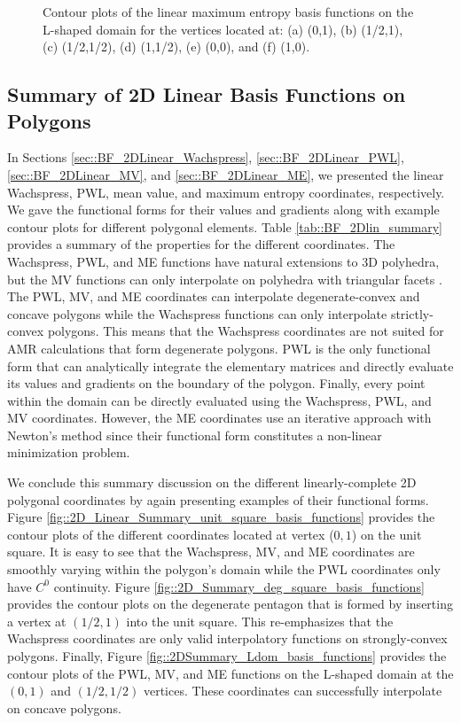 \begin{figure}
\begin{subfigure}[b]{0.39\textwidth}
		\caption{}
	\end{subfigure}
\caption{Contour plots of the linear maximum entropy basis functions on the L-shaped domain for the vertices located at: (a) (0,1), (b) (1/2,1), (c) (1/2,1/2), (d) (1,1/2), (e) (0,0), and (f) (1,0).}
\label{fig::2D_MAXENT1_Ldom_basis_functions}
\end{figure}

\subsection{Summary of 2D Linear Basis Functions on Polygons}
\label{sec::BF_2DLinear_Summary}

In Sections \ref{sec::BF_2DLinear_Wachspress}, \ref{sec::BF_2DLinear_PWL}, \ref{sec::BF_2DLinear_MV}, and \ref{sec::BF_2DLinear_ME}, we presented the linear Wachspress, PWL, mean value, and maximum entropy coordinates, respectively. We gave the functional forms for their values and gradients along with example contour plots for different polygonal elements. Table \ref{tab::BF_2Dlin_summary} provides a summary of the properties for the different coordinates. The Wachspress, PWL, and ME functions have natural extensions to 3D polyhedra, but the MV functions can only interpolate on polyhedra with triangular facets \cite{floater2005mean,wicke2007finite}. The PWL, MV, and ME coordinates can interpolate degenerate-convex and concave polygons while the Wachspress functions can only interpolate strictly-convex polygons. This means that the Wachspress coordinates are not suited for AMR calculations that form degenerate polygons. PWL is the only functional form that can analytically integrate the elementary matrices and directly evaluate its values and gradients on the boundary of the polygon. Finally, every point within the domain can be directly evaluated using the Wachspress, PWL, and MV coordinates. However, the ME coordinates use an iterative approach with Newton's method since their functional form constitutes a non-linear minimization problem.

We conclude this summary discussion on the different linearly-complete 2D polygonal coordinates by again presenting examples of their functional forms. Figure \ref{fig::2D_Linear_Summary_unit_square_basis_functions} provides the contour plots of the different coordinates located at vertex ($0,1$) on the unit square. It is easy to see that the Wachspress, MV, and ME coordinates are smoothly varying within the polygon's domain while the PWL coordinates only have $C^0$ continuity. Figure \ref{fig::2D_Summary_deg_square_basis_functions} provides the contour plots on the degenerate pentagon that is formed by inserting a vertex at $(1/2,1)$ into the unit square. This re-emphasizes that the Wachspress coordinates are only valid interpolatory functions on strongly-convex polygons. Finally, Figure \ref{fig::2DSummary_Ldom_basis_functions} provides the contour plots of the PWL, MV, and ME functions on the L-shaped domain at the $(0,1)$ and $(1/2,1/2)$ vertices. These coordinates can successfully interpolate on concave polygons.

